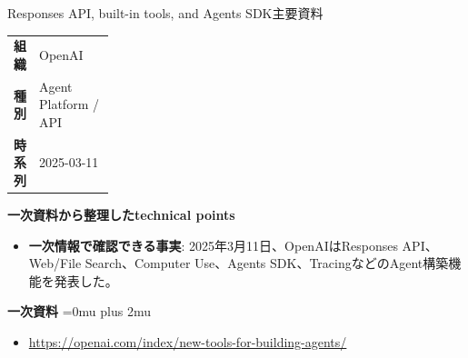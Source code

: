 \begin{technicalnote}{Responses API, built-in tools, and Agents SDK}{主要資料}
\begingroup
\begin{tabularx}{\linewidth}{@{}>{\bfseries}p{0.22\linewidth}X@{}}
組織 & OpenAI \\
種別 & Agent Platform / API \\
時系列 & 2025-03-11 \\
\end{tabularx}
\smallskip
\begin{minipage}{\linewidth}
{\bfseries 一次資料から整理したtechnical points}
\begin{itemize}[leftmargin=1.5em,itemsep=0.35em]
\item \textbf{一次情報で確認できる事実}: 2025年3月11日、OpenAIはResponses API、Web/File Search、Computer Use、Agents SDK、TracingなどのAgent構築機能を発表した。
\end{itemize}
\begin{samepage}
{\bfseries 一次資料}
\begingroup\sloppy
\Urlmuskip=0mu plus 2mu\relax
\begin{itemize}[leftmargin=1.5em,itemsep=0.25em]
\item {\scriptsize\url{https://openai.com/index/new-tools-for-building-agents/}}
\end{itemize}
\endgroup
\end{samepage}
\end{minipage}
\endgroup
\end{technicalnote}
\medskip

